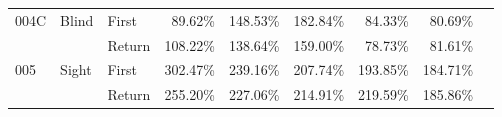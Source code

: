 \begin{table}[!htb]
\begin{tabular}{lllrrrrrr}
004C & Blind & First &   89.62\% &  148.53\% &                                              182.84\% &                                                84.33\% &    80.69\% \\
    &       & Return &  108.22\% &  138.64\% &                                              159.00\% &                                                78.73\% &    81.61\% \\
005 & Sight & First &  302.47\% &  239.16\% &                                              207.74\% &                                               193.85\% &   184.71\% \\
    &       & Return &  255.20\% &  227.06\% &                                              214.91\% &                                               219.59\% &   185.86\% \\
\bottomrule
\end{tabular}
\end{table}

